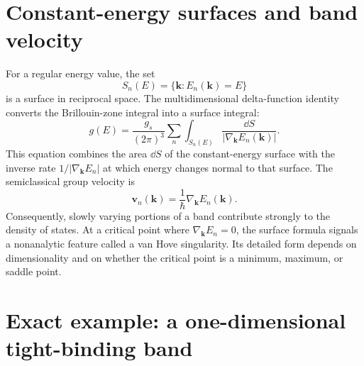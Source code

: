 \section{Constant-energy surfaces and band velocity}

For a regular energy value, the set
\begin{equation}
  S_n(E)=\{\bm k:E_n(\bm k)=E\}
  \label{eq:constant-energy-surface-definition}
\end{equation}
is a surface in reciprocal space.  The multidimensional delta-function identity
converts the Brillouin-zone integral into a surface integral:
\begin{equation}
  \boxed{
  g(E)
  =\frac{g_s}{(2\pi)^3}
   \sum_n\int_{S_n(E)}
   \frac{\dd S}{|\nabla_{\bm k}E_n(\bm k)|}.
  }
  \label{eq:dos-constant-energy-surface}
\end{equation}
This equation combines the area $\dd S$ of the constant-energy surface with the
inverse rate $1/|\nabla_{\bm k}E_n|$ at which energy changes normal to that
surface.
The semiclassical group velocity is
\begin{equation}
  \bm v_n(\bm k)
  =\frac{1}{\hbar}\nabla_{\bm k}E_n(\bm k).
  \label{eq:dos-band-group-velocity}
\end{equation}
Consequently, slowly varying portions of a band contribute strongly to the
density of states.  At a critical point where
$\nabla_{\bm k}E_n=0$, the surface formula signals a nonanalytic feature called
a van Hove singularity.  Its detailed form depends on dimensionality and on
whether the critical point is a minimum, maximum, or saddle point.

\section{Exact example: a one-dimensional tight-binding band}

